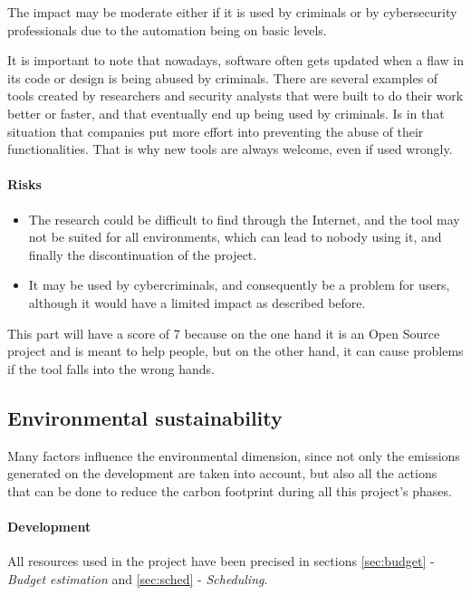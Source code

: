 The impact may be moderate either if it is used by criminals or by cybersecurity professionals due to the automation being on basic levels. 

\pagebreak
It is important to note that nowadays, software often gets updated when a flaw in its code or design is being abused by criminals. There are several examples of tools created by researchers and security analysts that were built to do their work better or faster, and that eventually end up being used by criminals. Is in that situation that companies put more effort into preventing the abuse of their functionalities. That is why new tools are always welcome, even if used wrongly.

\paragraph{Risks}
\begin{itemize}
\item The research could be difficult to find through the Internet, and the tool may not be suited for all environments, which can lead to nobody using it, and finally the discontinuation of the project. 
\item It may be used by cybercriminals, and consequently be a problem for users, although it would have a limited impact as described before.
\end{itemize}

This part will have a score of 7 because on the one hand it is an Open Source project and is meant to help people, but on the other hand, it can cause problems if the tool falls into the wrong hands. 


\subsection{Environmental sustainability}

Many factors influence the environmental dimension, since not only the emissions generated on the development are taken into account, but also all the actions that can be done to reduce the carbon footprint during all this project's phases.

\paragraph{Development}
All resources used in the project have been precised in sections \ref{sec:budget} - \textit{Budget estimation} and \ref{sec:sched} - \textit{Scheduling}.

